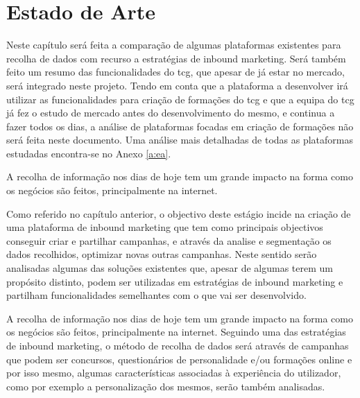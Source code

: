 \chapter{Estado de Arte}
\label{sec:estado-arte}

Neste capítulo será feita a comparação de algumas plataformas existentes para recolha de dados com recurso a estratégias de inbound marketing. Será também feito um resumo das funcionalidades do \acrshort{tcg}, que apesar de já estar no mercado, será integrado neste projeto. Tendo em conta que a plataforma a desenvolver irá utilizar as funcionalidades para criação de formações do \acrshort{tcg} e que a equipa do \acrlong{tcg} já fez o estudo de mercado antes do desenvolvimento do mesmo, e continua a fazer todos os dias, a análise de plataformas focadas em criação de formações não será feita neste documento. Uma análise mais detalhadas de todas as plataformas estudadas encontra-se no Anexo \ref{a:ea}.

A recolha de informação nos dias de hoje tem um grande impacto na forma como os negócios são feitos, principalmente na internet.

Como referido no capítulo anterior, o objectivo deste estágio incide na criação de uma plataforma de inbound marketing que tem como principais objectivos conseguir criar e partilhar campanhas, e através da analise e segmentação os dados recolhidos, optimizar novas outras campanhas. Neste sentido serão analisadas algumas das soluções existentes que, apesar de algumas terem um propósito distinto, podem ser utilizadas em estratégias de inbound marketing e partilham funcionalidades semelhantes com o que vai ser desenvolvido. 

A recolha de informação nos dias de hoje tem um grande impacto na forma como os negócios são feitos, principalmente na internet. Seguindo uma das estratégias de inbound marketing, o método de recolha de dados será através de campanhas que podem ser concursos, questionários de personalidade e/ou formações online e por isso mesmo, algumas características associadas à experiência do utilizador, como por exemplo a personalização dos mesmos, serão também analisadas.


